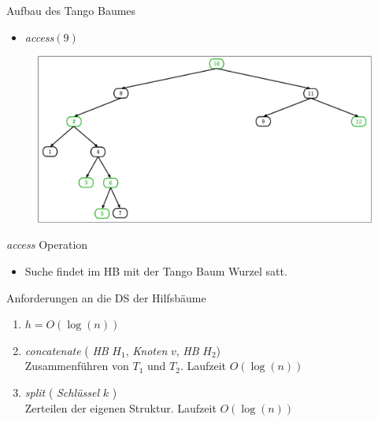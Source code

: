 \documentclass[11pt]{beamer}
\begin{document}
\begin{frame} {Aufbau des Tango Baumes}
		\begin{itemize}
		\item \textit{access}$\left(9\right)$
	\end{itemize}
	\begin{figure}[H]
		\centering
		\includegraphics[width=1\textwidth]{"Medien/pres/tangoBaum2"}
	\end{figure}
\end{frame}


\begin{frame} {\textit{access }Operation}
		\begin{itemize}
		\item Suche findet im HB mit der Tango Baum Wurzel satt.
	\end{itemize}
	
	Anforderungen an die DS der Hilfsbäume
	\begin{enumerate}
		\item $h = O\left(\log\left(n\right)\right)$
		\item \textit{concatenate} ( \textit{HB} $H_1$, \textit{Knoten } $v$, \textit{HB} $H_2$)\\
		Zusammenführen von $T_1$ und $T_2$. Laufzeit $O\left(\log\left(n\right)\right)$
		\item \textit{split} ( \textit{Schlüssel} $k$ )\\
		Zerteilen der eigenen Struktur. Laufzeit $O\left(\log\left(n\right)\right)$
	\end{enumerate}
 \end{frame}
\end{document}

